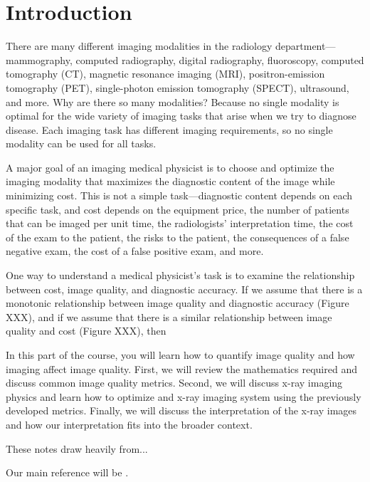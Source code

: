 \documentclass[mphy386-notes.tex]{subfiles}
\begin{document}
\section{Introduction}
There are many different imaging modalities in the radiology department---
mammography, computed radiography, digital radiography, fluoroscopy, computed
tomography (CT), magnetic resonance imaging (MRI), positron-emission tomography
(PET), single-photon emission tomography (SPECT), ultrasound, and more. Why are
there so many modalities? Because no single modality is optimal for the
wide variety of imaging tasks that arise when we try to diagnose disease. Each
imaging task has different imaging requirements, so no single modality can be
used for all tasks.

A major goal of an imaging medical physicist is to choose and optimize the
imaging modality that maximizes the diagnostic content of the image while
minimizing cost. This is not a simple task---diagnostic content depends on each
specific task, and cost depends on the equipment price, the number of patients
that can be imaged per unit time, the radiologists’ interpretation time, the
cost of the exam to the patient, the risks to the patient, the consequences of a
false negative exam, the cost of a false positive exam, and more.

One way to understand a medical physicist's task is to examine the relationship
between cost, image quality, and diagnostic accuracy. If we assume that there is
a monotonic relationship between image quality and diagnostic accuracy (Figure
XXX), and if we assume that there is a similar relationship between image
quality and cost (Figure XXX), then 

In this part of the course, you will learn how to quantify image quality and how
imaging affect image quality. First, we will review the mathematics required and
discuss common image quality metrics. Second, we will discuss x-ray imaging
physics and learn how to optimize and x-ray imaging system using the previously
developed metrics. Finally, we will discuss the interpretation of the x-ray images
and how our interpretation fits into the broader context. 

These notes draw heavily from...

Our main reference will be \cite{barrett}. 
\pagebreak
\end{document}
